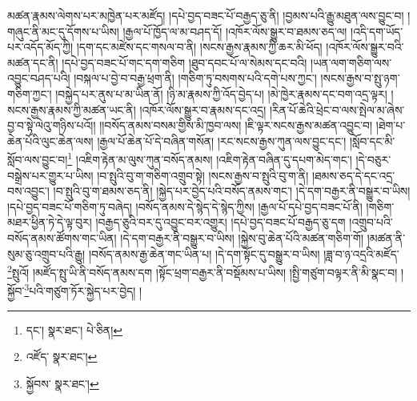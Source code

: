 མཚན་རྣམས་ལེགས་པར་མཁྱེན་པར་མཛོད། །དཔེ་བྱད་བཟང་པོ་བརྒྱད་ཅུ་ནི། །བྱམས་པའི་རྒྱུ་མཐུན་ལས་བྱུང་བ། །གཞུང་ནི་མང་དུ་དོགས་པ་ཡིས། །རྒྱལ་པོ་ཁྱོད་ལ་མ་བཤད་དོ། །འཁོར་ལོས་སྒྱུར་བ་ཐམས་ཅད་ལ། །འདི་དག་ཡོད་པར་འདོད་མོད་ཀྱི། །དག་དང་མཛེས་དང་གསལ་བ་ནི། །སངས་རྒྱས་རྣམས་ཀྱི་ཆར་མི་ཕོད། །འཁོར་ལོས་སྒྱུར་བའི་མཚན་དང་ནི། །དཔེ་བྱད་བཟང་པོ་གང་དག་གཅིག །ཐུབ་དབང་པོ་ལ་སེམས་དང་བའི། །ཡན་ལག་གཅིག་ལས་འབྱུང་བཤད་པའི། །བསྐལ་པ་བྱེ་བ་བརྒྱ་ཕྲག་ནི། །གཅིག་ཏུ་བསགས་པའི་དགེ་པས་ཀྱང་། །སངས་རྒྱས་བ་སྤུ་ཉག་གཅིག་ཀྱང་། །བསྐྱེད་པར་ནུས་པ་མ་ཡིན་ནོ། །ཉི་མ་རྣམས་ཀྱི་འོད་བྱེད་པ། །མེ་ཁྱེར་རྣམས་དང་བག་འདྲ་ལྟར། །སངས་རྒྱས་རྣམས་ཀྱི་མཚན་ཡང་ནི། །འཁོར་ལོས་སྒྱུར་བ་རྣམས་དང་འདྲ། །རིན་པོ་ཆེའི་ཕྲེང་བ་ལས་སྤེལ་མ་ཞེས་བྱ་བ་སྟེ་ལེའུ་གཉིས་པའོ།། །།བསོད་ནམས་བསམ་གྱིས་མི་ཁྱབ་ལས། །ཇི་ལྟར་སངས་རྒྱས་མཚན་འབྱུང་བ། །ཐེག་པ་ཆེན་པོའི་ལུང་ཆེན་ལས། །རྒྱལ་པོ་ཆེན་པོ་དེ་བཞིན་གསོན། །རང་སངས་རྒྱས་ཀུན་ལས་བྱུང་དང་། །སློབ་དང་མི་སློབ་ལས་བྱུང་བ།\footnote{དང་།  སྣར་ཐང་།  པེ་ཅིན། } །འཇིག་རྟེན་མ་ལུས་ཀུན་བསོད་ནམས། །འཇིག་རྟེན་བཞིན་དུ་དཔག་མེད་གང་། །དེ་བཅུར་བསྒྲེས་པར་གྱུར་པ་ཡིས། །བ་སྤུའི་བུ་ག་གཅིག་འགྲུབ་སྟེ། །སངས་རྒྱས་བ་སྤུའི་བུ་ག་ནི། །ཐམས་ཅད་དེ་དང་འདྲ་བས་འབྱུང་། །བ་སྤུའི་བུ་ག་ཐམས་ཅད་ནི། །སྐྱེད་པར་བྱེད་པའི་བསོད་ནམས་གང་། །དེ་དག་བརྒྱར་ནི་བསྒྱུར་བ་ཡིས། །དཔེ་བྱད་བཟང་པོ་གཅིག་ཏུ་བཞེད། །བསོད་ནམས་དེ་སྙེད་དེ་སྙེད་ཀྱིས། །རྒྱལ་པོ་དཔེ་བྱད་བཟང་པོ་ནི། །གཅིག་མཐར་ཕྱིན་ཏེ་དེ་ལྟ་བུར། །བརྒྱད་ཅུའི་བར་དུ་འབྱུང་བར་འགྱུར། །དཔེ་བྱད་བཟང་པོ་བརྒྱད་ཅུ་དག །འགྲུབ་པའི་བསོད་ནམས་ཚོགས་གང་ཡིན། །དེ་དག་བརྒྱར་ནི་བསྒྱུར་བ་ཡིས། །སྐྱེས་བུ་ཆེན་པོའི་མཚན་གཅིག་གོ། །མཚན་ནི་སུམ་ཅུ་འགྲུབ་པའི་རྒྱུ། །བསོད་ནམས་རྒྱ་ཆེན་གང་ཡིན་པ། །དེ་དག་སྟོང་དུ་བསྒྱུར་བ་ཡིས། །ཟླ་བ་ཉ་འདྲའི་མཛོད་\footnote{འཛོད་  སྣར་ཐང་། }སྤུའོ། །མཛོད་སྤུ་ཡི་ནི་བསོད་ནམས་དག །སྟོང་ཕྲག་བརྒྱར་ནི་བསྡོམས་པ་ཡིས། །སྤྱི་གཙུག་བལྟར་ནི་མི་སྣང་བ། །སྐྱོབ་\footnote{སྐྱོབས་  སྣར་ཐང་། }པའི་གཙུག་ཏོར་སྐྱེད་པར་བྱེད། །

